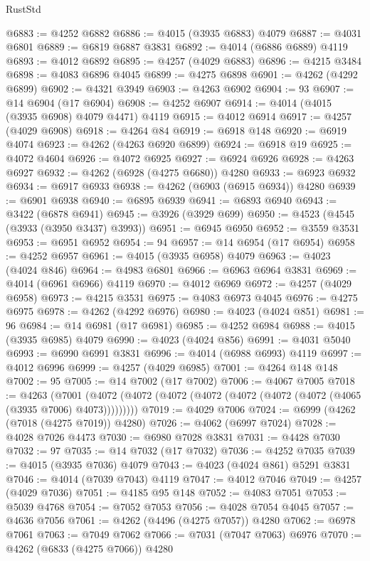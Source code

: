 \begin{lexlean}{RustStd}
\begin{coremodule}
@6883 := @4252 @6882
@6886 := @4015 (@3935 @6883) @4079
@6887 := @4031 @6801
@6889 := @6819 @6887 @3831
@6892 := @4014 (@6886 @6889) @4119
@6893 := @4012 @6892
@6895 := @4257 (@4029 @6883)
@6896 := @4215 @3484
@6898 := @4083 @6896 @4045
@6899 := @4275 @6898
@6901 := @4262 (@4292 @6899)
@6902 := @4321 @3949
@6903 := @4263 @6902
@6904 := 93
@6907 := @14 @6904 (@17 @6904)
@6908 := @4252 @6907
@6914 := @4014 (@4015 (@3935 @6908) @4079 @4471) @4119
@6915 := @4012 @6914
@6917 := @4257 (@4029 @6908)
@6918 := @4264 @84
@6919 := @6918 @148
@6920 := @6919 @4074
@6923 := @4262 (@4263 @6920 @6899)
@6924 := @6918 @19
@6925 := @4072 @4604
@6926 := @4072 @6925
@6927 := @6924 @6926
@6928 := @4263 @6927
@6932 := @4262 (@6928 (@4275 @6680)) @4280
@6933 := @6923 @6932
@6934 := @6917 @6933
@6938 := @4262 (@6903 (@6915 @6934)) @4280
@6939 := @6901 @6938
@6940 := @6895 @6939
@6941 := @6893 @6940
@6943 := @3422 (@6878 @6941)
@6945 := @3926 (@3929 @699)
@6950 := @4523 (@4545 (@3933 (@3950 @3437) @3993))
@6951 := @6945 @6950
@6952 := @3559 @3531
@6953 := @6951 @6952
@6954 := 94
@6957 := @14 @6954 (@17 @6954)
@6958 := @4252 @6957
@6961 := @4015 (@3935 @6958) @4079
@6963 := @4023 (@4024 @846)
@6964 := @4983 @6801
@6966 := @6963 @6964 @3831
@6969 := @4014 (@6961 @6966) @4119
@6970 := @4012 @6969
@6972 := @4257 (@4029 @6958)
@6973 := @4215 @3531
@6975 := @4083 @6973 @4045
@6976 := @4275 @6975
@6978 := @4262 (@4292 @6976)
@6980 := @4023 (@4024 @851)
@6981 := 96
@6984 := @14 @6981 (@17 @6981)
@6985 := @4252 @6984
@6988 := @4015 (@3935 @6985) @4079
@6990 := @4023 (@4024 @856)
@6991 := @4031 @5040
@6993 := @6990 @6991 @3831
@6996 := @4014 (@6988 @6993) @4119
@6997 := @4012 @6996
@6999 := @4257 (@4029 @6985)
@7001 := @4264 @148 @148
@7002 := 95
@7005 := @14 @7002 (@17 @7002)
@7006 := @4067 @7005
@7018 := @4263
    (@7001 (@4072 (@4072 (@4072 (@4072 (@4072 (@4072 (@4072 (@4065 (@3935 @7006) @4073)))))))))
@7019 := @4029 @7006
@7024 := @6999 (@4262 (@7018 (@4275 @7019)) @4280)
@7026 := @4062 (@6997 @7024)
@7028 := @4028 @7026 @4473
@7030 := @6980 @7028 @3831
@7031 := @4428 @7030
@7032 := 97
@7035 := @14 @7032 (@17 @7032)
@7036 := @4252 @7035
@7039 := @4015 (@3935 @7036) @4079
@7043 := @4023 (@4024 @861) @5291 @3831
@7046 := @4014 (@7039 @7043) @4119
@7047 := @4012 @7046
@7049 := @4257 (@4029 @7036)
@7051 := @4185 @95 @148
@7052 := @4083 @7051
@7053 := @5039 @4768
@7054 := @7052 @7053
@7056 := @4028 @7054 @4045
@7057 := @4636 @7056
@7061 := @4262 (@4496 (@4275 @7057)) @4280
@7062 := @6978 @7061
@7063 := @7049 @7062
@7066 := @7031 (@7047 @7063) @6976
@7070 := @4262 (@6833 (@4275 @7066)) @4280

\end{coremodule}
\end{lexlean}
